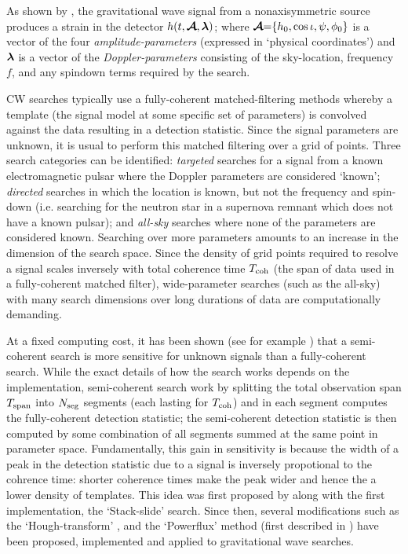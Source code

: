 \documentclass[aps, prd, twocolumn, superscriptaddress, floatfix, showpacs, nofootinbib, longbibliography]{revtex4-1}
\begin{document}
As shown by \citet{jks1998}, the gravitational wave signal from a
nonaxisymmetric source produces a strain in the detector $h(t, \boldsymbol{\mathcal{A}}, \boldsymbol{\mathbf{\lambda}})$;
where $\boldsymbol{\mathcal{A}}{=}\{h_0, \cos\iota, \psi, \phi_0\}$ is a vector of the four
\emph{amplitude-parameters} (expressed in `physical coordinates') and
$\boldsymbol{\mathbf{\lambda}}$ is a vector of the \emph{Doppler-parameters} consisting of the
sky-location, frequency $f$, and any spindown terms required by the search.

CW searches typically use a fully-coherent matched-filtering methods whereby a
template (the signal model at some specific set of parameters) is convolved
against the data resulting in a detection statistic. Since the signal
parameters are unknown, it is usual to perform this matched filtering over a
grid of points.  Three search categories can be identified: \emph{targeted}
searches for a signal from a known electromagnetic pulsar where the Doppler
parameters are considered `known'; \emph{directed} searches in which the
location is known, but not the frequency and spin-down (i.e.  searching for the
neutron star in a supernova remnant which does not have a known pulsar); and
\emph{all-sky} searches where none of the parameters are considered known.
Searching over more parameters amounts to an increase in the dimension of the
search space. Since the density of grid points required to resolve a signal
scales inversely with total coherence time $T_{\rm coh}$ (the span of data used in
a fully-coherent matched filter), wide-parameter searches (such as the all-sky)
with many search dimensions over long durations of data are computationally
demanding.

At a fixed computing cost, it has been shown (see for example \citep{brady1998,
prix2012}) that a semi-coherent search is more sensitive for unknown signals
than a fully-coherent search. While the exact details of how the search works
depends on the implementation, semi-coherent search work by splitting the total
observation span $T_{\rm span}$ into $N_{\rm seg}$ segments (each lasting for $T_{\rm coh}$) and
in each segment computes the fully-coherent detection statistic; the
semi-coherent detection statistic is then computed by some combination of all
segments summed at the same point in parameter space. Fundamentally, this gain
in sensitivity is because the width of a peak in the detection statistic due to
a signal is inversely propotional to the cohrence time: shorter coherence times
make the peak wider and hence the a lower density of templates. This idea was
first proposed by \citet{brady2000} along with the first implementation, the
`Stack-slide' search. Since then, several modifications such as the
`Hough-transform' \citep{krishnan2004, astone2014}, and the `Powerflux' method
(first described in \citet{allyskyS42008}) have been proposed, implemented and
applied to gravitational wave searches.
\end{document}
